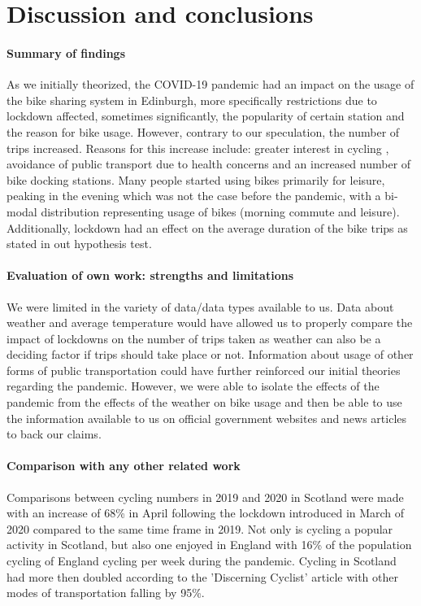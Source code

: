 \documentclass[11pt,a4paper]{article}
\begin{document}
\section{Discussion and conclusions}
\vspace{-5mm}
\paragraph{Summary of findings}
As we initially theorized, the COVID-19 pandemic had an impact on the usage of the bike sharing system in Edinburgh, more specifically restrictions due to lockdown affected, sometimes significantly, the  popularity of certain station and the reason for bike usage. However, contrary to our speculation, the number of trips increased. Reasons for this increase include: greater interest in cycling \cite{BBC_cycle}, avoidance of public transport due to health concerns and an increased number of bike docking stations. Many people started using bikes primarily for leisure, peaking in the evening which was not the case before the pandemic, with a bi-modal distribution representing usage of bikes (morning commute and leisure). Additionally, lockdown had an effect on the average duration of the bike trips as stated in out hypothesis test. 
\vspace{-4mm}
\paragraph{Evaluation of own work: strengths and limitations}
We were limited in the variety of data/data types available to us. Data about weather and average temperature would have allowed us to properly compare the impact of lockdowns on the number of trips taken as weather can also be a deciding factor if trips should take place or not. Information about usage of other forms of public transportation could have further reinforced our initial theories regarding the pandemic. However, we were able to isolate the effects of the pandemic from the effects of the weather on bike usage and then be able to use the information available to us on official government websites and news articles to back our claims.
\vspace{-4mm}
\paragraph{Comparison with any other related work}
Comparisons between cycling numbers in 2019 and 2020 in Scotland were made \cite{cycling_scot} with an increase of 68\% in April following the lockdown introduced in March of 2020 compared to the same time frame in 2019. Not only is cycling a popular activity in Scotland, but also one enjoyed in England \cite{england_cycle} with 16\% of the population cycling of England cycling per week during the pandemic. Cycling in Scotland had more then doubled according to the 'Discerning Cyclist' article with other modes of transportation falling by 95\%.
\vspace{-4mm}
\end{document}
